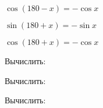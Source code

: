 \begin{listofex}
{{\begin{minipage}[t]{0,3\textwidth}
				\( \cos(180 - x) = -\cos x \)
			\end{minipage}
			\begin{minipage}[t]{0,3\textwidth}
				
				\( \sin(180+x) = -\sin x \)
				
				\( \cos(180+x) = -\cos x \)
			\end{minipage}
		}
	}
	\item Вычислить:
	\begin{enumcols}[itemcolumns=1]
		\item {}
		\item {}
		\item {}
	\end{enumcols}
	\item Вычислить:
	\begin{enumcols}[itemcolumns=2]
		\item {}
		\item {}
		\item {}
		\item {}
	\end{enumcols}
	\item Вычислить:
	\begin{enumcols}[itemcolumns=2]
		\item {}
		\item {}
		\item {}
	\end{enumcols}
	\item {}
\end{listofex}